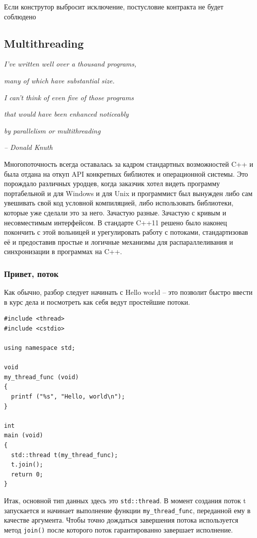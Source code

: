 \documentclass[a4paper,12pt,oneside]{article}
\begin{document}
Если конструтор выбросит исключение, постусловие контракта не будет соблюдено

\pagebreak
\subsection{Multithreading}

\hfill\textit{I’ve written well over a thousand programs,}

\hfill\textit{many of which have substantial size.}

\hfill\textit{I can’t think of even five of those programs}

\hfill\textit{that would have been enhanced noticeably}

\hfill\textit{by parallelism or multithreading}{\vspace{0.5em}}

\hfill\textit{-- Donald Knuth}

Многопоточность всегда оставалась за кадром стандартных возможностей C++ и была отдана на откуп API конкретных библиотек и операционной системы. Это порождало различных уродцев, когда заказчик хотел видеть программу портабельной и для Windows и для Unix и программист был вынужден либо сам увешивать свой код условной компиляцией, либо использовать библиотеки, которые уже сделали это за него. Зачастую разные. Зачастую с кривым и несовместимым интерфейсом. В стандарте C++11 решено было наконец покончить с этой вольницей и урегулировать работу с потоками, стандартизовав её и предоставив простые и логичные механизмы для распараллеливания и синхронизации в программах на C++.

\subsubsection{Привет, поток}

Как обычно, разбор следует начинать с Hello world -- это позволит быстро ввести в курс дела и посмотреть как себя ведут простейшие потоки.

\begin{lstlisting}
#include <thread>
#include <cstdio>

using namespace std;

void 
my_thread_func (void)
{
  printf ("%s", "Hello, world\n");
}

int 
main (void)
{
  std::thread t(my_thread_func);
  t.join();
  return 0;
}
\end{lstlisting}

Итак, основной тип данных здесь это \lstinline!std::thread!. В момент создания поток t запускается и начинает выполнение функции \lstinline!my_thread_func!, переданной ему в качестве аргумента. Чтобы точно дождаться завершения потока используется метод \lstinline!join()! после которого поток гарантированно завершает исполнение.
\end{document}
